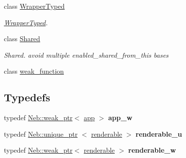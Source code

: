 \begin{DoxyCompactItemize}
class \hyperlink{classNeb_1_1WrapperTyped}{\-Wrapper\-Typed}
\begin{DoxyCompactList}\small\item\em \hyperlink{classNeb_1_1WrapperTyped}{\-Wrapper\-Typed}. \end{DoxyCompactList}\item 
class \hyperlink{classNeb_1_1Shared}{\-Shared}
\begin{DoxyCompactList}\small\item\em \-Shared. avoid multiple enabled\-\_\-shared\-\_\-from\-\_\-this bases \end{DoxyCompactList}\item 
class \hyperlink{classNeb_1_1weak__function}{weak\-\_\-function}
\end{DoxyCompactItemize}
\subsection*{\-Typedefs}
\begin{DoxyCompactItemize}
\item 
\hypertarget{namespaceNeb_aa4fcad20cebfd0160ee2d0285a6fc129}{typedef \hyperlink{classNeb_1_1weak__ptr}{\-Neb\-::weak\-\_\-ptr}$<$ \hyperlink{classNeb_1_1app}{app} $>$ {\bfseries app\-\_\-w}}\label{namespaceNeb_aa4fcad20cebfd0160ee2d0285a6fc129}

\item 
\hypertarget{namespaceNeb_ae8d36138d23d3c479a601c88b3393b43}{typedef \hyperlink{classNeb_1_1unique__ptr}{\-Neb\-::unique\-\_\-ptr}\*
$<$ \hyperlink{classNeb_1_1renderable}{renderable} $>$ {\bfseries renderable\-\_\-u}}\label{namespaceNeb_ae8d36138d23d3c479a601c88b3393b43}

\item 
\hypertarget{namespaceNeb_a0aac28857d44701417babbe71c47de0b}{typedef \hyperlink{classNeb_1_1weak__ptr}{\-Neb\-::weak\-\_\-ptr}$<$ \hyperlink{classNeb_1_1renderable}{renderable} $>$ {\bfseries renderable\-\_\-w}}\label{namespaceNeb_a0aac28857d44701417babbe71c47de0b}

\end{DoxyCompactItemize}
